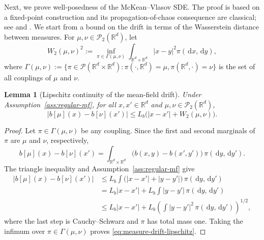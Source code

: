 \documentclass[11pt]{amsart}
\numberwithin{equation}{section}
\theoremstyle{plain}
\newtheorem{lemma}[theorem]{Lemma}
\newcommand{\R}{\mathbb{R}}
\newcommand{\cP}{\mathcal{P}}
\newcommand{\dd}{\,\mathrm{d}}
\newcommand{\abs}[1]{\left\lvert#1\right\rvert}
\begin{document}
Next, we prove well-posedness of the McKean--Vlasov SDE.  The proof is based on a fixed-point construction and its propagation-of-chaos consequence are classical; see \cite{Sznitman1991} and \cite{CarmonaDelarue2018}. We start from a bound on the drift in terms of the Wasserstein distance between measures. 
For $\mu,\nu\in\cP_2(\R^d)$, let
\[
 W_2(\mu,\nu)^2
 :=\inf_{\pi\in\Gamma(\mu,\nu)}
   \int_{\R^d\times\R^d}\abs{x-y}^2\pi(\dd x,\dd y), 
\]
where $\Gamma(\mu,\nu):= \{ \pi \in \mathcal{P}(\R^d \times \R^d) : \pi(\cdot, \R^d) = \mu, \pi(\R^d, \cdot) = \nu \}$ is the set of all couplings of $\mu$ and $\nu$. 


\begin{lemma}[Lipschitz continuity of the mean-field drift]
\label{lem:measure-drift-lipschitz}
Under Assumption~\ref{ass:regular-mf}, for all
$x,x'\in\R^d$ and $\mu,\nu\in\cP_2(\R^d)$,
\begin{equation}\label{eq:measure-drift-lipschitz}
 \abs{b[\mu](x)-b[\nu](x')}
 \leq L_b\bigl(\abs{x-x'}+W_2(\mu,\nu)\bigr).
\end{equation}
\end{lemma}
\begin{proof}
Let $\pi\in\Gamma(\mu,\nu)$ be any coupling.  Since the first and second
marginals of $\pi$ are $\mu$ and $\nu$, respectively,
\[
 b[\mu](x)-b[\nu](x')
 =\int_{\R^d\times\R^d}
   \bigl(b(x,y)-b(x',y')\bigr)\,\pi(\dd y,\dd y').
\]
The triangle inequality and Assumption~\ref{ass:regular-mf} give
\begin{align*}
 \abs{b[\mu](x)-b[\nu](x')}
 &\leq L_b\int
   \bigl(\abs{x-x'}+\abs{y-y'}\bigr)\,\pi(\dd y,\dd y')\\
 &=L_b\abs{x-x'}
   +L_b\int\abs{y-y'}\,\pi(\dd y,\dd y')\\
 &\leq L_b\abs{x-x'}
   +L_b\left(\int\abs{y-y'}^2\,\pi(\dd y,\dd y')\right)^{1/2},
\end{align*}
where the last step is Cauchy--Schwarz and $\pi$ has total mass one.
Taking the infimum over $\pi\in\Gamma(\mu,\nu)$ proves
\eqref{eq:measure-drift-lipschitz}.
\end{proof}
\end{document}
